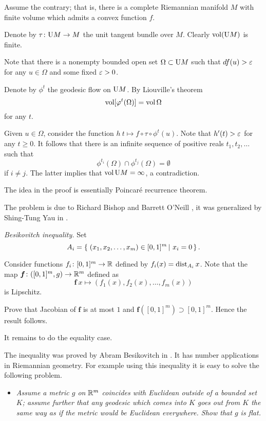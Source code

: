 Assume the contrary; that is, there is a complete Riemannian manifold $M$
with finite volume which admits a convex function $f$.

Denote by $\tau\colon\mathrm{U} M\to M$ the unit tangent bundle over $M$. 
Clearly $\operatorname{\rm vol} (\mathrm{U} M)$ is finite.

Note that 
there is a nonempty bounded open set $\Omega\subset \mathrm{U} M$
such that $df(u)>\varepsilon$ for any $u\in \Omega$ and some fixed $\varepsilon>0$.

Denote by $\phi^t$ the geodesic flow on $\mathrm{U} M$.
By Liouville's theorem 
\[\operatorname{\rm vol}[\varphi^t(\Omega)]=\operatorname{\rm vol}\Omega\] 
for any $t$.

Given $u\in \Omega$,
consider the function $h\:t\mapsto f\circ\tau\circ\phi^t(u)$.
Note that $h'(t)>\varepsilon$ for any $t\ge 0$.
It follows that there is an infinite sequence of positive reals $t_1,t_2,\dots$
such that 
$$\phi^{t_i}(\Omega)\cap\phi^{t_j}(\Omega)=\emptyset$$ 
if $i\ne j$.
The latter implies that $\operatorname{\rm vol} \mathrm{U} M=\infty$,
a contradiction.

 The idea in the proof is essentially 
Poincar\'e recurrence theorem.

The problem is due 
to Richard Bishop and Barrett O'Neill \cite[see][]{bishop-oneill},
it was generalized by
Shing-Tung Yau  in \cite{yau}.


\textit{Besikovitch inequality.}
Set 
\[A_i=\set{(x_1,x_2,\dots,x_m)\in[0,1]^m}{x_i=0}.\]

Consider functions $f_i\colon[0,1]^m\to\mathbb{R}$ defined by
$f_i(x)=\operatorname{\rm dist}_{A_i}x$.
Note that 
the map $\bm{f}\colon([0,1]^m,g)\to\mathbb{R}^m$
defined as
\[\bm{f}\:x\mapsto(f_1(x),f_2(x),\dots,f_m(x))\]
is Lipschitz.

Prove that Jacobian of  $\bm{f}$
is at most $1$
and $\bm{f}([0,1]^m)\supset [0,1]^m$.
Hence the result follows.

It remains to do the equality case.

The inequality was proved by Abram Besikovitch in \cite{besicovitch}.
It has number applications in Riemannian geometry.
For example using this inequality it is easy to solve the following problem.
\begin{itemize}
\item {\it Assume a metric $g$ on $\mathbb{R}^m$ coincides with Euclidean outside of a bounded set $K$;
assume further that any geodesic which comes into $K$ goes out from $K$ the same way as if the metric would be Euclidean everywhere. 
Show that $g$ is flat.}
\end{itemize}



